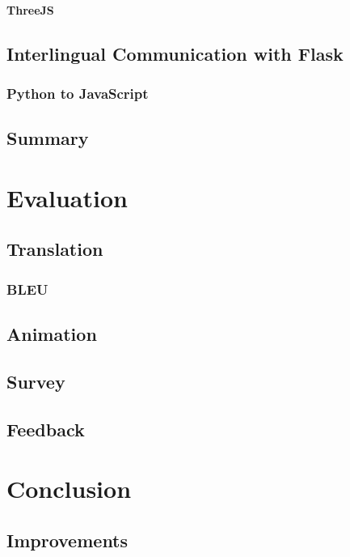 \documentclass[12pt]{ociamthesis}  %
\begin{document}
		\subsubsection{ThreeJS}
	
\section{Interlingual Communication with Flask}
	\subsection{Python to JavaScript}

\section{Summary}
			

\chapter{Evaluation}

\section{Translation}
	\subsection{BLEU}
\section{Animation}
\section{Survey}
\section{Feedback}


\chapter{Conclusion}

\section{Improvements}
\end{document}
